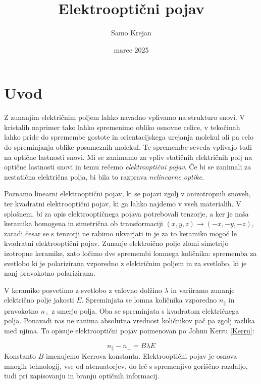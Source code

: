 \documentclass[12pt]{article}
\title{\textbf{Elektrooptični pojav}}
\author{Samo Krejan}
\date{marec 2025}
\begin{document}
\maketitle

\section{Uvod}

Z zunanjim električnim poljem lahko navadno vplivamo na strukturo snovi. V kristalih naprimer tako lahko spremenimo obliko osnovne celice, v tekočinah lahko pride do spremembe gostote in orientacijskega urejanja molekul ali pa celo do spreminjanja oblike posameznih molekul. Te spremembe seveda vplivajo tudi na optične lastnosti snovi. Mi se zanimamo za vpliv statičnih električnih polj na optične lastnosti snovi in temu rečemo \textit{elektrooptični pojav}. Če bi se zanimali za nestatična električna polja, bi bila to razprava \textit{nelinearne optike}.

Poznamo linearni elektrooptični pojav, ki se pojavi zgolj v anizotropnih snoveh, ter kvadratni elektrooptični pojav, ki ga lahko najdemo v vseh materialih. V splošnem, bi za opis elektrooptičnega pojava potrebovali tenzorje, a ker je naša keramika homogena in simetrična ob transformaciji $(x,y,z) \rightarrow (-x, -y,-z)$, zaradi česar se s tenzorji ne rabimo ukvarjati in je za to keramiko mogoč le kvadratni elektrooptični pojav. Zunanje elektroično polje zlomi simetrijo izotropne keramike, zato ločimo dve spremembi lomnega količnika: sprememba za svetlobo ki je polarizirana vzporedno z električnim poljem in za svetlobo, ki je nanj pravokotno polarizirana. 

V keramiko posvetimo z svetlobo z valovno dolžino $\lambda$ in variiramo zunanje električno polje jakosti $E$. Spreminjata se lomna količnika vzporedno $n_{\parallel}$ in pravokotno $n_{\perp}$ z smerjo polja. Oba se spreminjata s kvadratom električnega polja. Ponavadi nas ne zanima absolutna vrednost količnikov pač pa zgolj razlika med njima. To opisuje elektrooptični pojav poimenovan po Johnu Kerru \ref{Kerru}:

\begin{equation}
    n_{\parallel} - n_{\perp} = B\lambda E
    \label{Kerru}
\end{equation}
Konstanto $B$ imenujemo Kerrova konstanta. Elektrooptični pojav je osnova mnogih tehnologij, vse od atenuatorjev, do leč s spremenjivo goriščno razdaljo, tudi pri zapisovanju in branju optičnih informacij. 
\end{document}
